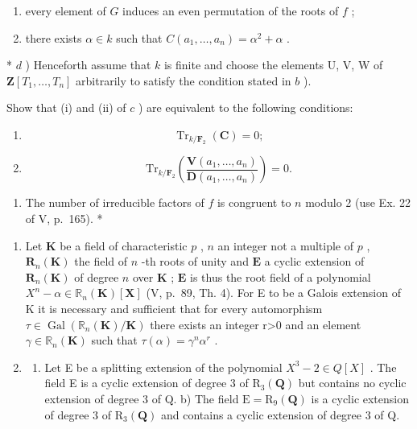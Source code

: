 \begin{enumerate}
\def\labelenumi{(\roman{enumi})}
\item
  every element of \(G\) induces an even permutation of the roots of \(f\) ;
\item
  there exists \(\alpha \in k\) such that \(C(a_{1},\ldots ,a_{n}) = \alpha^{2} + \alpha\) .
\end{enumerate}

* \(d\) ) Henceforth assume that \(k\) is finite and choose the elements U, V, W of \(\mathbf{Z}[T_1, \ldots, T_n]\) arbitrarily to satisfy the condition stated in \(b\) ).

Show that (i) and (ii) of \(c\) ) are equivalent to the following conditions:

\begin{enumerate}
\def\labelenumi{(\roman{enumi})}
\setcounter{enumi}{2}
\tightlist
\item
  \[
\operatorname{Tr} _ {k / \mathbf {F} _ {2}} (\mathbf {C}) = 0;
\]
\item
  \[
\mathrm{Tr} _ {k / \mathbf {F} _ {2}} \left(\frac {\mathbf {V} (a _ {1} , \dots , a _ {n})}{\mathbf {D} (a _ {1} , \dots , a _ {n})}\right) = 0.
\]
\end{enumerate}

\begin{enumerate}
\def\labelenumi{(\alph{enumi})}
\setcounter{enumi}{21}
\tightlist
\item
  The number of irreducible factors of \(f\) is congruent to \(n\) modulo 2 (use Ex. 22 of V, p.~165). *
\end{enumerate}

\BourbakiExerciseGroup

\begin{enumerate}
\def\labelenumi{\arabic{enumi})}
\item
  Let \(\mathbf{K}\) be a field of characteristic \(p\) , \(n\) an integer not a multiple of \(p\) , \(\mathbf{R}_n(\mathbf{K})\) the field of \(n\) -th roots of unity and \(\mathbf{E}\) a cyclic extension of \(\mathbf{R}_n(\mathbf{K})\) of degree \(n\) over \(\mathbf{K}\) ; \(\mathbf{E}\) is thus the root field of a polynomial \(X^{n}-\alpha\in\mathbb{R}_{n}(\mathbf{K})[\mathbf{X}]\) (V, p.~89, Th. 4). For E to be a Galois extension of K it is necessary and sufficient that for every automorphism \(\tau\in\operatorname{Gal}\left(\mathbb{R}_{n}(\mathbf{K})/\mathbf{K}\right)\) there exists an integer r\textgreater0 and an element \(\gamma\in\mathbb{R}_{n}(\mathbf{K})\) such that \(\tau(\alpha)=\gamma^{n}\alpha^{r}\) .
\item
  \begin{enumerate}
  \def\labelenumii{\alph{enumii})}
  \tightlist
  \item
    Let E be a splitting extension of the polynomial \(X^{3}-2\in Q[X]\) . The field E is a cyclic extension of degree 3 of \(\mathrm{R}_{3}(\mathbf{Q})\) but contains no cyclic extension of degree 3 of Q. b) The field \(\mathrm{E}=\mathrm{R}_{9}(\mathbf{Q})\) is a cyclic extension of degree 3 of \(\mathrm{R}_{3}(\mathbf{Q})\) and contains a cyclic extension of degree 3 of Q.
  \end{enumerate}
\end{enumerate}

